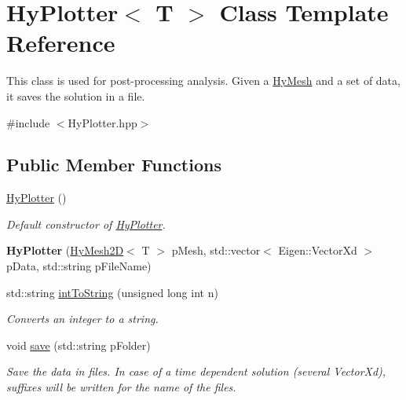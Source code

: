 \hypertarget{classHyPlotter}{
\section{HyPlotter$<$ T $>$ Class Template Reference}
\label{classHyPlotter}
}


This class is used for post-\/processing analysis. Given a \hyperlink{classHyMesh}{HyMesh} and a set of data, it saves the solution in a file.  




{\ttfamily \#include $<$HyPlotter.hpp$>$}

\subsection*{Public Member Functions}
\begin{DoxyCompactItemize}
\item 
\hypertarget{classHyPlotter_a50b452f5b5747d4505e2e9e85943fbd1}{
\hyperlink{classHyPlotter_a50b452f5b5747d4505e2e9e85943fbd1}{HyPlotter} ()}
\label{classHyPlotter_a50b452f5b5747d4505e2e9e85943fbd1}

\begin{DoxyCompactList}\small\item\em Default constructor of \hyperlink{classHyPlotter}{HyPlotter}. \item\end{DoxyCompactList}\item 
\hypertarget{classHyPlotter_ace9cd6b9ea3082dc8e31f5b6461deb6b}{
{\bfseries HyPlotter} (\hyperlink{classHyMesh2D}{HyMesh2D}$<$ T $>$ pMesh, std::vector$<$ Eigen::VectorXd $>$ pData, std::string pFileName)}
\label{classHyPlotter_ace9cd6b9ea3082dc8e31f5b6461deb6b}

\item 
std::string \hyperlink{classHyPlotter_a3901644f0e38b620ebe2c02b2198aa23}{intToString} (unsigned long int n)
\begin{DoxyCompactList}\small\item\em Converts an integer to a string. \item\end{DoxyCompactList}\item 
void \hyperlink{classHyPlotter_acb107c1c3cf44bb32b900c329830fdfd}{save} (std::string pFolder)
\begin{DoxyCompactList}\small\item\em Save the data in files. In case of a time dependent solution (several VectorXd), suffixes will be written for the name of the files. \item\end{DoxyCompactList}\end{DoxyCompactItemize}
